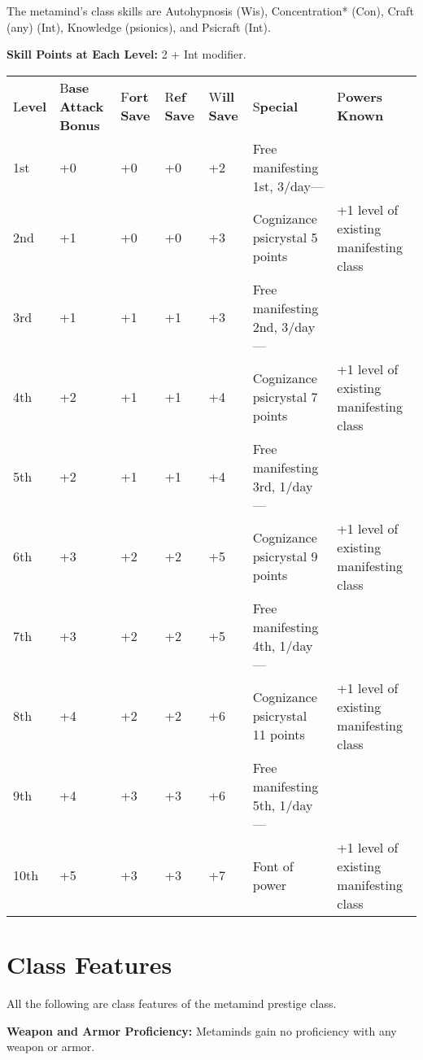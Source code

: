 \documentclass{article}
\begin{document}
The metamind's class skills are Autohypnosis (Wis), Concentration* (Con), Craft 
(any) (Int), Knowledge (psionics), and Psicraft (Int).

\textbf{Skill Points at Each Level:} 2 + Int modifier.

\vspace{12pt}
\begin{tabular}{|>{\raggedright}p{15pt}|>{\raggedright}p{31pt}|>{\raggedright}p{16pt}|>{\raggedright}p{16pt}|>{\raggedright}p{18pt}|>{\raggedright}p{78pt}|>{\raggedright}p{90pt}|}
\hline
\multicolumn{7}{|p{266pt}|}{\section*{T\textbf{able: The Metamind}}}\tabularnewline
\hline
L\textbf{evel} & B\textbf{ase Attack Bonus} & F\textbf{ort Save} & R\textbf{ef 
Save} & W\textbf{ill Save} & S\textbf{pecial} & P\textbf{owers Known}\tabularnewline
\hline
1st & +0 & +0 & +0 & +2 & Free manifesting 1st, 3/day--- & \tabularnewline
\hline
2nd & +1 & +0 & +0 & +3 & Cognizance psicrystal 5 points & +1 level of existing 
manifesting class\tabularnewline
\hline
3rd & +1 & +1 & +1 & +3 & Free manifesting 2nd, 3/day--- & \tabularnewline
\hline
4th & +2 & +1 & +1 & +4 & Cognizance psicrystal 7 points & +1 level of existing 
manifesting class\tabularnewline
\hline
5th & +2 & +1 & +1 & +4 & Free manifesting 3rd, 1/day--- & \tabularnewline
\hline
6th & +3 & +2 & +2 & +5 & Cognizance psicrystal 9 points & +1 level of existing 
manifesting class\tabularnewline
\hline
7th & +3 & +2 & +2 & +5 & Free manifesting 4th, 1/day--- & \tabularnewline
\hline
8th & +4 & +2 & +2 & +6 & Cognizance psicrystal 11 points & +1 level of existing 
manifesting class\tabularnewline
\hline
9th & +4 & +3 & +3 & +6 & Free manifesting 5th, 1/day--- & \tabularnewline
\hline
10th & +5 & +3 & +3 & +7 & Font of power & +1 level of existing manifesting class\tabularnewline
\hline
\end{tabular}

\vspace{12pt}
\section*{\textbf{Class Features}}

All the following are class features of the metamind prestige class.

\textbf{Weapon and Armor Proficiency:} Metaminds gain no proficiency with any weapon 
or armor.
\end{document}
